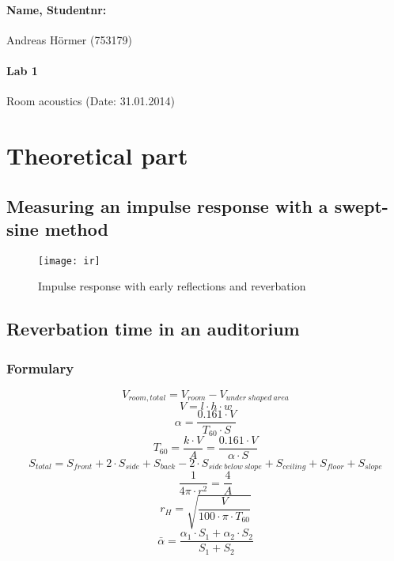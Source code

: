 \documentclass{article}
\begin{document}
	\paragraph{Name, Studentnr: }Andreas H\"ormer (753179)
	\paragraph{Lab 1}Room acoustics (Date: 31.01.2014)

	\section{Theoretical part}
		\subsection{Measuring an impulse response with a swept-sine method}
			\begin{figure}[htbp]
				\begin{center}
					\texttt{[image: ir]}
					\caption{Impulse response with early reflections and reverbation}
					\label{irtheory}
				\end{center}
			\end{figure}

		\subsection{Reverbation time in an auditorium}
			\subsubsection{Formulary}
				\begin{equation}
					V_{room,total}=V_{room}-V_{under\ shaped\ area}
				\end{equation}
				\begin{equation}
					V=l\cdot h\cdot w
				\end{equation}
				\begin{equation}
					\alpha=\frac{0.161\cdot V}{T_{60}\cdot S}
				\end{equation}
				\begin{equation}
					T_{60}=\frac{k\cdot V}{A}=\frac{0.161\cdot V}{\alpha\cdot S}
				\end{equation}
				\begin{equation}
					S_{total}=S_{front}+2\cdot S_{side}+S_{back}-2\cdot S_{side\ below\ slope}+S_{ceiling}+S_{floor}+S_{slope}
				\end{equation}
				\begin{equation}
					\frac{1}{4\pi\cdot r^2}=\frac{4}{A}
				\end{equation}
				\begin{equation}
					r_H=\sqrt{\frac{V}{100\cdot\pi\cdot T_{60}}}
				\end{equation}
				\begin{equation}
					\bar{\alpha}=\frac{\alpha_1\cdot S_1+\alpha_2\cdot S_2}{S_1+S_2}
				\end{equation}
\end{document}
